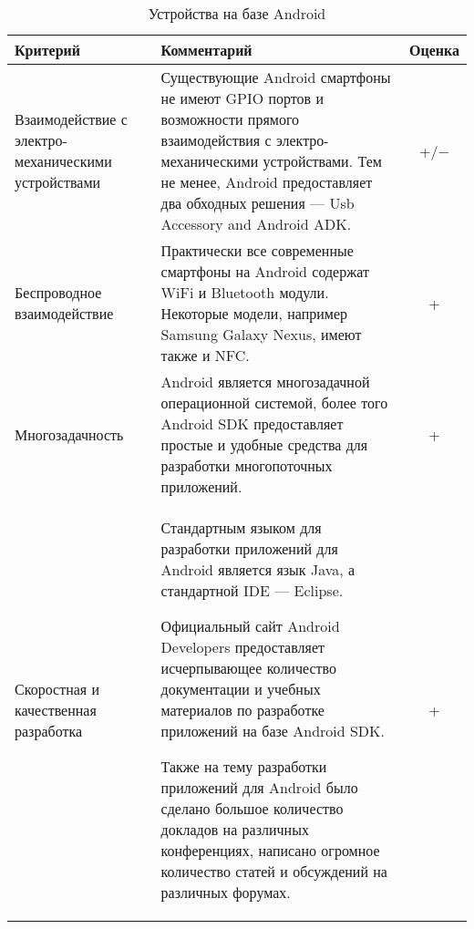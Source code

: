 \bgroup %
\def\arraystretch{1.5}%
  \begin{longtable}{| p{} | p{} | c |} 
  \caption{Устройства на базе Android} %
  \hline
    Критерий & Комментарий & Оценка \\
  \hline
    Взаимодействие с электро-механическими устройствами

    & Существующие Android смартфоны не имеют GPIO портов и возможности прямого взаимодействия с электро-механическими устройствами. Тем не менее, Android предоставляет два обходных решения — Usb Accessory and Android ADK.

    & +/$-$ \\
  \hline
    Беспроводное взаимодействие

    & Практически все современные смартфоны на Android содержат WiFi и Bluetooth модули. Некоторые модели, например Samsung Galaxy Nexus, имеют также и NFC.
    
    & + \\
  \hline
    Многозадачность

    & Android является многозадачной операционной системой, более того Android SDK предоставляет простые и удобные средства для разработки многопоточных приложений.

    & + \\
  \hline
    Скоростная и качественная разработка
    
    & Стандартным языком для разработки приложений для Android является язык Java, а стандартной IDE — Eclipse.

    Официальный сайт Android Developers предоставляет исчерпывающее количество документации и учебных материалов по разработке приложений на базе Android SDK. 

    Также на тему разработки приложений для Android было сделано большое количество докладов на различных конференциях, написано огромное количество статей и обсуждений на различных форумах.

    & + \\
  \hline
  \end{longtable}
\egroup %

\pagebreak

